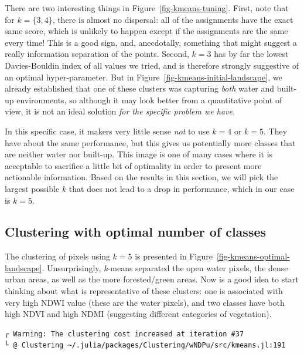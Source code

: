 \documentclass[
  letterpaper,
]{scrbook}
\begin{document}
There are two interesting things in Figure~\ref{fig-kmeans-tuning}.
First, note that for \(k=\{3,4\}\), there is almost no dispersal: all of
the assignments have the exact same score, which is unlikely to happen
except if the assignments are the same every time! This is a good sign,
and, anecdotally, something that might suggest a really information
separation of the points. Second, \(k = 3\) has by far the lowest
Davies-Bouldin index of all values we tried, and is therefore strongly
suggestive of an optimal hyper-parameter. But in
Figure~\ref{fig-kmeans-initial-landscape}, we already established that
one of these clusters was capturing \emph{both} water and built-up
environments, so although it may look better from a quantitative point
of view, it is not an ideal solution \emph{for the specific problem we
have}.

In this specific case, it makers very little sense \emph{not} to use
\(k = 4\) or \(k = 5\). They have about the same performance, but this
gives us potentially more classes that are neither water nor built-up.
This image is one of many cases where it is acceptable to sacrifice a
little bit of optimality in order to present more actionable
information. Based on the results in this section, we will pick the
largest possible \(k\) that does not lead to a drop in performance,
which in our case is \(k=5\).

\subsection{Clustering with optimal number of
classes}\label{clustering-with-optimal-number-of-classes}

The clustering of pixels using \(k = 5\) is presented in
Figure~\ref{fig-kmeans-optimal-landscape}. Unsurprisingly,
\emph{k}-means separated the open water pixels, the dense urban areas,
as well as the more forested/green areas. Now is a good idea to start
thinking about what is representative of these clusters: one is
associated with very high NDWI value (these are the water pixels), and
two classes have both high NDVI and high NDMI (suggesting different
categories of vegetation).

\begin{verbatim}
┌ Warning: The clustering cost increased at iteration #37
└ @ Clustering ~/.julia/packages/Clustering/wNDPu/src/kmeans.jl:191
\end{verbatim}
\end{document}
